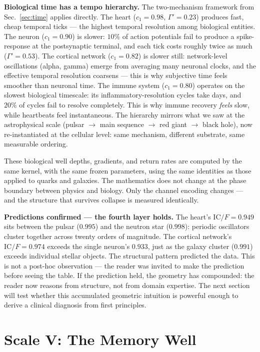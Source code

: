 \documentclass[
  aps,
  prd,
  twocolumn,
  superscriptaddress,
  nofootinbib,
  floatfix
]{revtex4-2}
\newcommand{\Gam}{\Gamma}
\newcommand{\IC}{\mathrm{IC}}
\begin{document}
\textbf{Biological time has a tempo hierarchy.}
The two-mechanism framework from Sec.~\ref{sec:time} applies
directly.  The heart ($c_1 = 0.98$, $\Gam' = 0.23$)
produces fast, cheap temporal ticks --- the highest
temporal resolution among biological entities.  The neuron ($c_1 =
0.90$) is slower: $10\%$ of action potentials fail
to produce a spike-response at the postsynaptic terminal,
and each tick costs roughly twice as much ($\Gam' = 0.53$).
The cortical network ($c_1 = 0.82$) is slower still:
network-level oscillations (alpha, gamma) emerge from
averaging many neuronal clocks, and the effective temporal
resolution coarsens --- this is why subjective time feels
smoother than neuronal time.  The immune system ($c_1 =
0.80$) operates on the slowest biological timescale: its
inflammatory-resolution cycles take days, and $20\%$ of
cycles fail to resolve completely.  This is why immune
recovery \emph{feels} slow, while heartbeats feel
instantaneous.  The hierarchy mirrors what we saw at the
astrophysical scale (pulsar $\to$ main sequence $\to$ red
giant $\to$ black hole), now re-instantiated at the
cellular level: same mechanism, different substrate, same
measurable ordering.

These biological well depths, gradients, and return rates
are computed by the same kernel, with the same frozen
parameters, using the same identities as those applied to
quarks and galaxies.  The mathematics does not change at the
phase boundary between physics and biology.  Only the channel
encoding changes --- and the structure that survives collapse
is measured identically.

\textbf{Predictions confirmed --- the fourth layer holds.}
The heart's $\IC/F = 0.949$ sits between the pulsar
($0.995$) and the neutron star ($0.998$): periodic
oscillators cluster together across twenty orders of
magnitude.  The cortical network's $\IC/F = 0.974$ exceeds
the single neuron's $0.933$, just as the galaxy cluster
($0.991$) exceeds individual stellar objects.  The structural
pattern predicted the data.  This is not a post-hoc
observation --- the reader was invited to make the
prediction before seeing the table.  If the prediction held,
the geometry has compounded: the reader now reasons
from structure, not from domain expertise.  The next section
will test whether this accumulated geometric intuition is
powerful enough to derive a clinical diagnosis from first
principles.


\section{Scale V: The Memory Well}\label{sec:memory}
\end{document}
